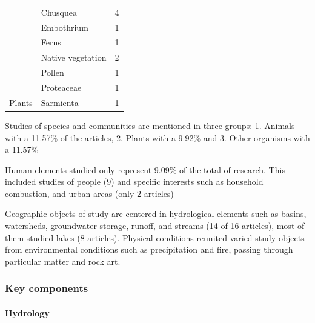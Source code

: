 \documentclass[]{article}
\let\oldparagraph\paragraph
\renewcommand{\paragraph}[1]{\oldparagraph{#1}\mbox{}}
\begin{document}
\begin{table}
\begin{tabular}[t]{lll}
 & Chusquea & 4\\

 & Embothrium & 1\\

 & Ferns & 1\\

 & Native vegetation & 2\\

 & Pollen & 1\\

 & Proteaceae & 1\\

\multirow{-8}{*}{\raggedright\arraybackslash Plants} & Sarmienta & 1\\
\bottomrule
\end{tabular}
\end{table}

Studies of species and communities are mentioned in three groups: 1. Animals with a 11.57\% of the articles, 2. Plants with a 9.92\% and 3. Other organisms with a 11.57\%

Human elements studied only represent 9.09\% of the total of research. This included studies of people (9) and specific interests such as household combustion, and urban areas (only 2 articles)

Geographic objects of study are centered in hydrological elements such as basins, watersheds, groundwater storage, runoff, and streams (14 of 16 articles), most of them studied lakes (8 articles).
Physical conditions reunited varied study objects from environmental conditions such as precipitation and fire, passing through particular matter and rock art.

\hypertarget{key-components}{%
\subsubsection{Key components}\label{key-components}}

\hypertarget{hydrology}{%
\paragraph{Hydrology}\label{hydrology}}
\end{document}
